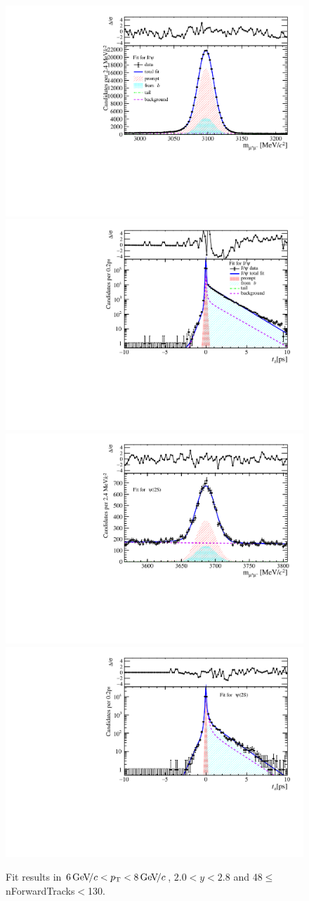 \begin{figure}[H]
\begin{center}
\includegraphics[width=0.47\linewidth]{pdf/Jpsi/drawmassF/n5y1pt4.pdf}
\includegraphics[width=0.47\linewidth]{pdf/Jpsi/2DFitF/n5y1pt4.pdf}
\vspace*{-0.5cm}
\includegraphics[width=0.47\linewidth]{pdf/Psi2S/drawmassF/n5y1pt4.pdf}
\includegraphics[width=0.47\linewidth]{pdf/Psi2S/2DFitF/n5y1pt4.pdf}
\vspace*{-0.5cm}
\end{center}
\caption{Fit results in $6\text{\,Ge\kern -0.1em V\!/}c<p_{\mathrm{T}}<8\text{\,Ge\kern -0.1em V\!/}c$, $2.0<y<2.8$ and 48$\leq$nForwardTracks$<$130.}
\label{Fitn5y1pt4}
\end{figure}

